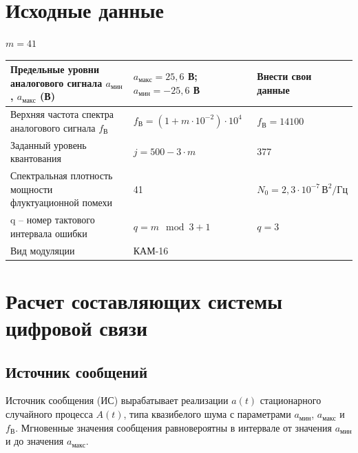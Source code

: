 \documentclass[a4paper, 12pt]{article}
\begin{document}
\section{Исходные данные}
$m=41$
\begin{center}
  \begin{tabular}{ | p{5cm} | p{5cm} | p{5cm} | } 
    \hline
    Предельные уровни аналогового сигнала \(a_{мин}\), \(a_{макс}\) (В) & \(a_{макс}=25,6\) В;\newline\(a_{мин}=-25,6\) В & Внести свои данные \\
    \hline
    Верхняя частота спектра аналогового сигнала \(f_В\) & \(f_В =(1+m\cdot 10^{-2})\cdot 10^4\) & \(f_В =14100\) \\ 
    \hline
    Заданный уровень квантования & \(j=500-3\cdot m\) & 377 \\
    \hline
    Спектральная плотность мощности флуктуационной помехи & 41 & \(N_0=2,3\cdot 10^{-7}\, В^2/Гц\)\\
    \hline
    q -- номер тактового интервала ошибки & \(q=m\mod{3}+1\) & \(q=3\)\\
    \hline
    Вид модуляции & КАМ-16 & \\
    \hline
  \end{tabular}
\end{center}

\section{Расчет составляющих системы цифровой связи}

\subsection{Источник сообщений}
Источник сообщения (ИС) вырабатывает реализации $a(t)$ стационарного
случайного процесса $A(t)$, типа квазибелого шума с параметрами 
$a_{мин}$, $a_{макс}$ и $f_В$. Мгновенные значения сообщения
равновероятны в интервале от значения $a_{мин}$ и до значения 
$a_{макс}$.
\end{document}

